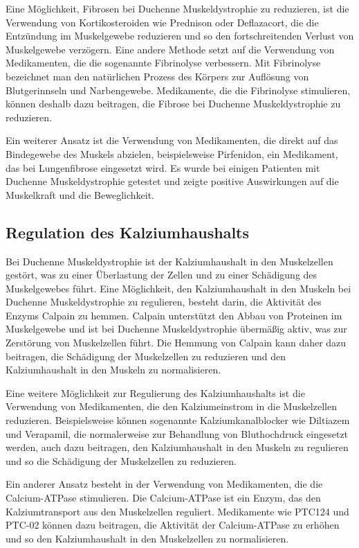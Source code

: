 \documentclass[fontsize=14pt,a4paper,headinclude,DIV=calc,automark]{scrbook}
\begin{document}
Eine Möglichkeit, Fibrosen bei Duchenne Muskeldystrophie zu reduzieren, ist die Verwendung von Kortikosteroiden wie Prednison oder Deflazacort, die die Entzündung im Muskelgewebe reduzieren und so den fortschreitenden Verlust von Muskelgewebe verzögern. Eine andere Methode setzt auf die Verwendung von Medikamenten, die die sogenannte Fibrinolyse verbessern. Mit Fibrinolyse bezeichnet man den natürlichen Prozess des Körpers zur Auflösung von Blutgerinnseln und Narbengewebe. Medikamente, die die Fibrinolyse stimulieren, können deshalb dazu beitragen, die Fibrose bei Duchenne Muskeldystrophie zu reduzieren.

Ein weiterer Ansatz ist die Verwendung von Medikamenten, die direkt auf das Bindegewebe des Muskels abzielen, beispielsweise Pirfenidon, ein Medikament, das bei Lungenfibrose eingesetzt wird. Es wurde bei einigen Patienten mit Duchenne Muskeldystrophie getestet und zeigte positive Auswirkungen auf die Muskelkraft und die Beweglichkeit.

\subsection{Regulation des Kalziumhaushalts}

Bei Duchenne Muskeldystrophie ist der Kalziumhaushalt in den Muskelzellen gestört, was zu einer Überlastung der Zellen und zu einer Schädigung des Muskelgewebes führt. Eine Möglichkeit, den Kalziumhaushalt in den Muskeln bei Duchenne Muskeldystrophie zu regulieren, besteht darin, die Aktivität des Enzyms Calpain zu hemmen. Calpain unterstützt den Abbau von Proteinen im Muskelgewebe und ist bei Duchenne Muskeldystrophie übermäßig aktiv, was zur Zerstörung von Muskelzellen führt. Die Hemmung von Calpain kann daher dazu beitragen, die Schädigung der Muskelzellen zu reduzieren und den Kalziumhaushalt in den Muskeln zu normalisieren.

Eine weitere Möglichkeit zur Regulierung des Kalziumhaushalts ist die Verwendung von Medikamenten, die den Kalziumeinstrom in die Muskelzellen reduzieren. Beispielsweise können sogenannte Kalziumkanalblocker wie Diltiazem und Verapamil, die normalerweise zur Behandlung von Bluthochdruck eingesetzt werden, auch dazu beitragen, den Kalziumhaushalt in den Muskeln zu regulieren und so die Schädigung der Muskelzellen zu reduzieren.

Ein anderer Ansatz besteht in der Verwendung von Medikamenten, die die Calcium-ATPase stimulieren. Die Calcium-ATPase ist ein Enzym, das den Kalziumtransport aus den Muskelzellen reguliert. Medikamente wie PTC124 und PTC-02 können dazu beitragen, die Aktivität der Calcium-ATPase zu erhöhen und so den Kalziumhaushalt in den Muskelzellen zu normalisieren.
\end{document}
